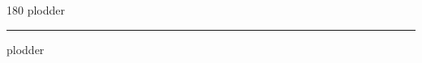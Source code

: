 
\begin{frame}
\begin{center}
\begin{turn}{180}
{\fontsize{2.5cm}{1em}\selectfont plodder}
\end{turn}
\vspace{1em}\par  
\hrule
\vspace{1em}\par  
{\fontsize{2.5cm}{1em}\selectfont plodder}
\end{center}
\end{frame}
